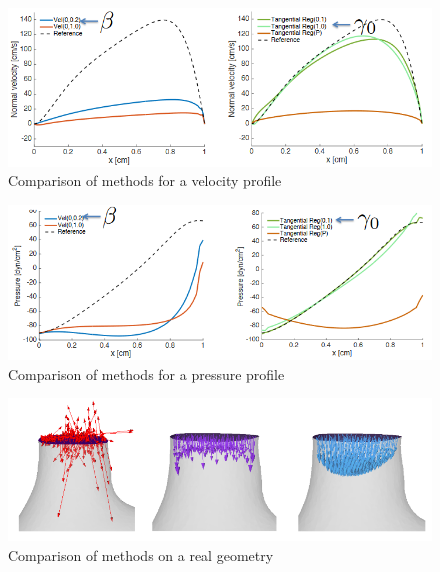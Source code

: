 \begin{figure}[t]
\centering
\includegraphics[width=\textwidth]{media/compare.PNG}
\caption{Comparison of methods for a velocity profile\label{fig:velocompare}}
\end{figure}
\begin{figure}[t]
\centering
\includegraphics[width=\textwidth]{media/presscompare.PNG}
\caption{Comparison of methods for a pressure profile\label{fig:presscompare}}
\end{figure}
\begin{figure}[t]
\centering
\includegraphics[width=\textwidth]{media/flowcomp.PNG}
\caption{Comparison of methods on a real geometry\label{fig:flowcompare}}
\end{figure}